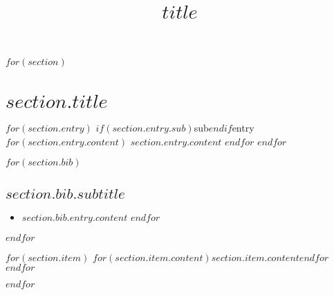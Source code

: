 \documentclass[a4paper]{moderncv}
\title{$title$}
\begin{document}
\maketitle
\nocite{*}

$for(section)$
\section{$section.title$}

$for(section.entry)$
\cv$if(section.entry.sub)$sub$endif$entry
$for(section.entry.content)$ {$section.entry.content$} $endfor$
$endfor$

$for(section.bib)$
\subsection{$section.bib.subtitle$}
\begin{itemize}
  $for(section.bib.entry)$
  \item $section.bib.entry.content$
  $endfor$
\end{itemize}
$endfor$

$for(section.item)$
\cvitem
$for(section.item.content)${$section.item.content$}$endfor$
$endfor$

$endfor$
\end{document}
